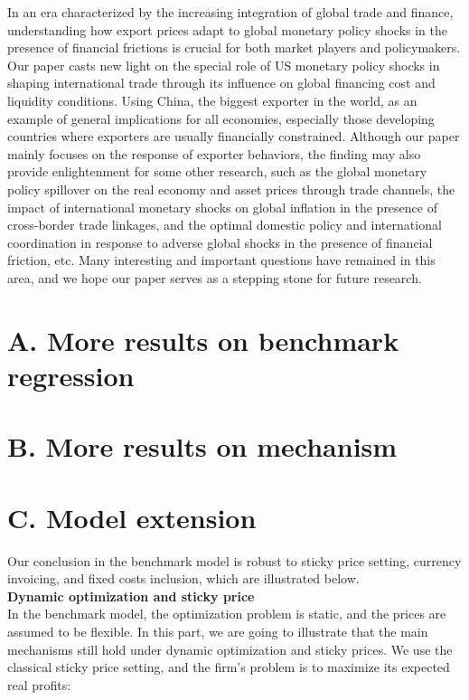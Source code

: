 In an era characterized by the increasing integration of global trade and finance, understanding how export prices adapt to global monetary policy shocks in the presence of financial frictions is crucial for both market players and policymakers. Our paper casts new light on the special role of US monetary policy shocks in shaping international trade through its influence on global financing cost and liquidity conditions. Using China, the biggest exporter in the world, as an example of general implications for all economies, especially those developing countries where exporters are usually financially constrained. Although our paper mainly focuses on the response of exporter behaviors, the finding may also provide enlightenment for some other research, such as the global monetary policy spillover on the real economy and asset prices through trade channels, the impact of international monetary shocks on global inflation in the presence of cross-border trade linkages, and the optimal domestic policy and international coordination in response to adverse global shocks in the presence of financial friction, etc. Many interesting and important questions have remained in this area, and we hope our paper serves as a stepping stone for future research.


\newpage


\appendix

\section{A. More results on benchmark regression}\label{app_benchmark}

\section{B. More results on mechanism}\label{app_mechanism}

\section{C. Model extension}\label{app_model}


Our conclusion in the benchmark model is robust to sticky price setting, currency invoicing, and fixed costs inclusion, which are illustrated below. \\

\textbf{Dynamic optimization and sticky price} \\

In the benchmark model, the optimization problem is static, and the prices are assumed to be flexible. In this part, we are going to illustrate that the main mechanisms still hold under dynamic optimization and sticky prices. We use the classical \cite{calvo1983staggered} sticky price setting, and the firm's problem is to maximize its expected real profits:


